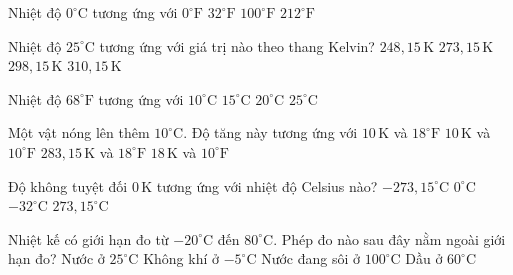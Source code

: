 \begin{ex}
Nhiệt độ $0^\circ\mathrm{C}$ tương ứng với
\choice
{$0^\circ\mathrm{F}$}
{\True $32^\circ\mathrm{F}$}
{$100^\circ\mathrm{F}$}
{$212^\circ\mathrm{F}$}
\end{ex}

\begin{ex}
Nhiệt độ $25^\circ\mathrm{C}$ tương ứng với giá trị nào theo thang Kelvin?
\choice
{$248{,}15\,\mathrm{K}$}
{$273{,}15\,\mathrm{K}$}
{\True $298{,}15\,\mathrm{K}$}
{$310{,}15\,\mathrm{K}$}
\end{ex}

\begin{ex}
Nhiệt độ $68^\circ\mathrm{F}$ tương ứng với
\choice
{$10^\circ\mathrm{C}$}
{$15^\circ\mathrm{C}$}
{\True $20^\circ\mathrm{C}$}
{$25^\circ\mathrm{C}$}
\end{ex}

\begin{ex}
Một vật nóng lên thêm $10^\circ\mathrm{C}$. Độ tăng này tương ứng với
\choice
{\True $10\,\mathrm{K}$ và $18^\circ\mathrm{F}$}
{$10\,\mathrm{K}$ và $10^\circ\mathrm{F}$}
{$283{,}15\,\mathrm{K}$ và $18^\circ\mathrm{F}$}
{$18\,\mathrm{K}$ và $10^\circ\mathrm{F}$}
\end{ex}

\begin{ex}
Độ không tuyệt đối $0\,\mathrm{K}$ tương ứng với nhiệt độ Celsius nào?
\choice
{\True $-273{,}15^\circ\mathrm{C}$}
{$0^\circ\mathrm{C}$}
{$-32^\circ\mathrm{C}$}
{$273{,}15^\circ\mathrm{C}$}
\end{ex}

\begin{ex}
Nhiệt kế có giới hạn đo từ $-20^\circ\mathrm{C}$ đến $80^\circ\mathrm{C}$. Phép đo nào sau đây nằm ngoài giới hạn đo?
\choice
{Nước ở $25^\circ\mathrm{C}$}
{Không khí ở $-5^\circ\mathrm{C}$}
{\True Nước đang sôi ở $100^\circ\mathrm{C}$}
{Dầu ở $60^\circ\mathrm{C}$}
\end{ex}

